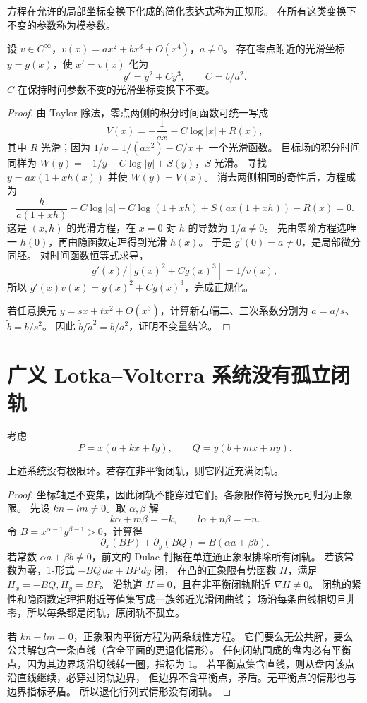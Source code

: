 \begin{definition}
方程在允许的局部坐标变换下化成的简化表达式称为正规形。
在所有这类变换下不变的参数称为模参数。
\end{definition}
\begin{theorem}
设 $v\in C^\infty$，$v(x)=ax^2+bx^3+O(x^4)$，$a\ne0$。
存在零点附近的光滑坐标 $y=g(x)$，使 $x'=v(x)$ 化为
\[
 y'=y^2+Cy^3,\qquad C=b/a^2.
\]
$C$ 在保持时间参数不变的光滑坐标变换下不变。
\end{theorem}
\begin{proof}
由 Taylor 除法，零点两侧的积分时间函数可统一写成
\[
 V(x)=-\frac1{ax}-C\log|x|+R(x),
\]
其中 $R$ 光滑；因为 $1/v=1/(ax^2)-C/x+$ 一个光滑函数。
目标场的积分时间同样为
$W(y)=-1/y-C\log|y|+S(y)$，$S$ 光滑。
寻找 $y=ax(1+xh(x))$ 并使 $W(y)=V(x)$。
消去两侧相同的奇性后，方程成为
\[
 \frac{h}{a(1+xh)}-C\log|a|-C\log(1+xh)
 +S(ax(1+xh))-R(x)=0.
\]
这是 $(x,h)$ 的光滑方程，在 $x=0$ 对 $h$ 的导数为 $1/a\ne0$。
先由零阶方程选唯一 $h(0)$，再由隐函数定理得到光滑 $h(x)$。
于是 $g'(0)=a\ne0$，是局部微分同胚。
对时间函数恒等式求导，
\[
 g'(x)/[g(x)^2+Cg(x)^3]=1/v(x),
\]
所以 $g'(x)v(x)=g(x)^2+Cg(x)^3$，完成正规化。

若任意换元 $y=sx+tx^2+O(x^3)$，计算新右端二、三次系数分别为
$\widetilde a=a/s$、$\widetilde b=b/s^2$。
因此 $\widetilde b/\widetilde a^2=b/a^2$，证明不变量结论。
\end{proof}

\section{广义 Lotka--Volterra 系统没有孤立闭轨}
考虑
\[
 P=x(a+kx+ly),\qquad Q=y(b+mx+ny).
\]
\begin{theorem}
上述系统没有极限环。若存在非平衡闭轨，则它附近充满闭轨。
\end{theorem}
\begin{proof}
坐标轴是不变集，因此闭轨不能穿过它们。各象限作符号换元可归为正象限。
先设 $kn-lm\ne0$。取 $\alpha,\beta$ 解
\[
 k\alpha+m\beta=-k,\qquad l\alpha+n\beta=-n.
\]
令 $B=x^{\alpha-1}y^{\beta-1}>0$，计算得
\[
 \partial_x(BP)+\partial_y(BQ)
 =B(\alpha a+\beta b).
\]
若常数 $\alpha a+\beta b\ne0$，前文的 Dulac 判据在单连通正象限排除所有闭轨。
若该常数为零，1-形式 $-BQ\,dx+BP\,dy$ 闭，
在凸的正象限有势函数 $H$，满足 $H_x=-BQ,H_y=BP$。
沿轨道 $\dot H=0$，且在非平衡闭轨附近 $\nabla H\ne0$。
闭轨的紧性和隐函数定理把附近等值集写成一族邻近光滑闭曲线；
场沿每条曲线相切且非零，所以每条都是闭轨，原闭轨不孤立。

若 $kn-lm=0$，正象限内平衡方程为两条线性方程。
它们要么无公共解，要么公共解包含一条直线（含全平面的更退化情形）。
任何闭轨围成的盘内必有平衡点，因为其边界场沿切线转一圈，指标为 1。
若平衡点集含直线，则从盘内该点沿直线继续，必穿过闭轨边界，
但边界不含平衡点，矛盾。无平衡点的情形也与边界指标矛盾。
所以退化行列式情形没有闭轨。
\end{proof}

